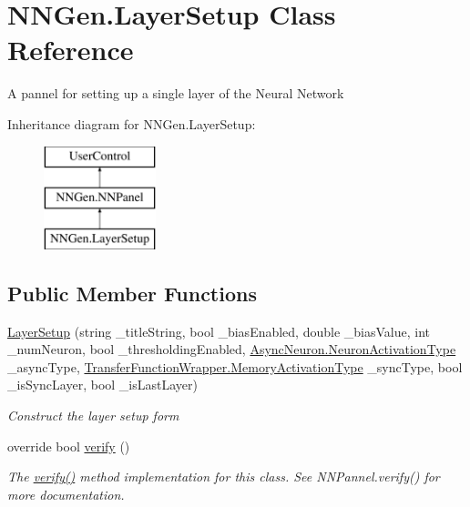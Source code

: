 \hypertarget{class_n_n_gen_1_1_layer_setup}{}\section{N\+N\+Gen.\+Layer\+Setup Class Reference}
\label{class_n_n_gen_1_1_layer_setup}


A pannel for setting up a single layer of the Neural Network  


Inheritance diagram for N\+N\+Gen.\+Layer\+Setup\+:\begin{figure}[H]
\begin{center}
\leavevmode
\includegraphics[height=3.000000cm]{class_n_n_gen_1_1_layer_setup}
\end{center}
\end{figure}
\subsection*{Public Member Functions}
\begin{DoxyCompactItemize}
\item 
\hyperlink{class_n_n_gen_1_1_layer_setup_a5daf76885695996275037fd51323d062}{Layer\+Setup} (string \+\_\+title\+String, bool \+\_\+bias\+Enabled, double \+\_\+bias\+Value, int \+\_\+num\+Neuron, bool \+\_\+thresholding\+Enabled, \hyperlink{class_n_n_gen_1_1_async_neuron_afe8460a52808d1587cbcc0a8e4e23b64}{Async\+Neuron.\+Neuron\+Activation\+Type} \+\_\+async\+Type, \hyperlink{class_n_n_gen_1_1_transfer_function_wrapper_aa338ffadb8fcdf76df75419374a51ff6}{Transfer\+Function\+Wrapper.\+Memory\+Activation\+Type} \+\_\+sync\+Type, bool \+\_\+is\+Sync\+Layer, bool \+\_\+is\+Last\+Layer)
\begin{DoxyCompactList}\small\item\em Construct the layer setup form \end{DoxyCompactList}\item 
override bool \hyperlink{class_n_n_gen_1_1_layer_setup_a0601d6640ad94c5e34316b60e70f8ede}{verify} ()
\begin{DoxyCompactList}\small\item\em The \hyperlink{class_n_n_gen_1_1_layer_setup_a0601d6640ad94c5e34316b60e70f8ede}{verify()} method implementation for this class. See N\+N\+Pannel.\+verify() for more documentation. \end{DoxyCompactList}\end{DoxyCompactItemize}
